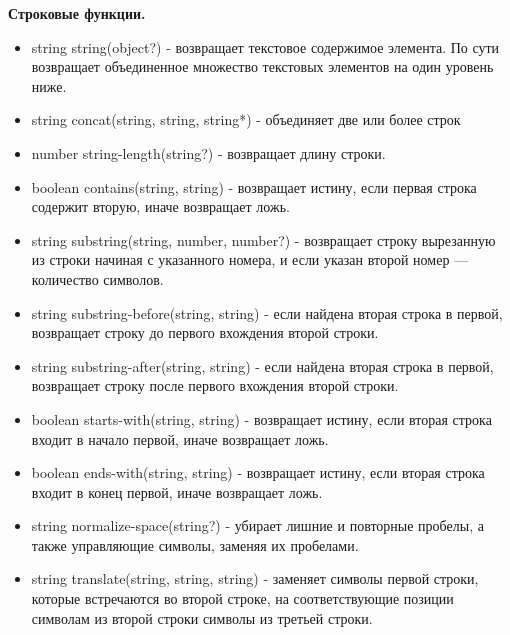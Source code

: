 \documentclass[12pt,a4paper,oneside]{article} %
\begin{document}
\textbf{Строковые функции.}

\begin{itemize}
\item string string(object?) - возвращает текстовое содержимое элемента. \linebreak
 По сути возвращает объединенное множество текстовых элементов на  \linebreak
 один уровень ниже.
\item string concat(string, string, string*) - объединяет две или более строк
\item number string-length(string?) - возвращает длину строки.
\item boolean contains(string, string) - возвращает истину, если первая  \linebreak
строка содержит вторую, иначе возвращает ложь.
\item string substring(string, number, number?) - возвращает строку  \linebreak
вырезанную из строки начиная с указанного номера, и если указан  \linebreak
второй номер — количество символов.
\item string substring-before(string, string) - если найдена вторая строка  \linebreak
в первой, возвращает строку до первого вхождения второй строки.
\item string substring-after(string, string) - если найдена вторая строка  \linebreak
в первой, возвращает строку после первого вхождения второй строки.
\item boolean starts-with(string, string) - возвращает истину, если  \linebreak
вторая строка входит в начало первой, иначе возвращает ложь.
\item boolean ends-with(string, string) - возвращает истину, если  \linebreak
вторая строка входит в конец первой, иначе возвращает ложь.
\item string normalize-space(string?) - убирает лишние и повторные  \linebreak
пробелы, а также управляющие символы, заменяя их пробелами.
\item string translate(string, string, string) - заменяет символы первой  \linebreak
строки, которые встречаются во второй строке, на соответствующие  \linebreak
позиции символам из второй строки символы из третьей строки.  \linebreak
\end{itemize}
\end{document}
